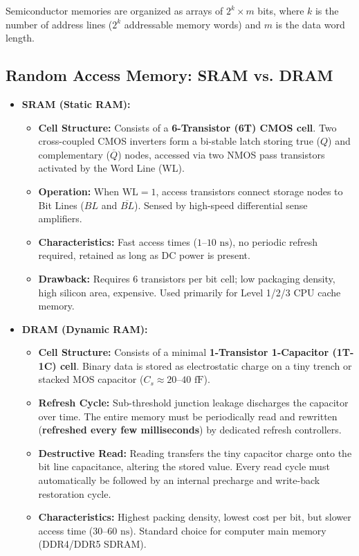 \documentclass[12pt,a4paper]{article}
\begin{document}
Semiconductor memories are organized as arrays of $2^k \times m$ bits, where $k$ is the number of address lines ($2^k$ addressable memory words) and $m$ is the data word length.

\subsection{Random Access Memory: SRAM vs. DRAM}
\begin{itemize}[leftmargin=*, itemsep=4pt]
  \item \textbf{SRAM (Static RAM):}
    \begin{itemize}
      \item \textbf{Cell Structure:} Consists of a \textbf{6-Transistor (6T) CMOS cell}. Two cross-coupled CMOS inverters form a bi-stable latch storing true ($Q$) and complementary ($\overline{Q}$) nodes, accessed via two NMOS pass transistors activated by the Word Line (WL).
      \item \textbf{Operation:} When $\text{WL} = 1$, access transistors connect storage nodes to Bit Lines ($BL$ and $\overline{BL}$). Sensed by high-speed differential sense amplifiers.
      \item \textbf{Characteristics:} Fast access times ($1\text{--}10\text{ ns}$), no periodic refresh required, retained as long as DC power is present.
      \item \textbf{Drawback:} Requires 6 transistors per bit cell; low packaging density, high silicon area, expensive. Used primarily for Level 1/2/3 CPU cache memory.
    \end{itemize}
  \item \textbf{DRAM (Dynamic RAM):}
    \begin{itemize}
      \item \textbf{Cell Structure:} Consists of a minimal \textbf{1-Transistor 1-Capacitor (1T-1C) cell}. Binary data is stored as electrostatic charge on a tiny trench or stacked MOS capacitor ($C_s \approx 20\text{--}40\text{ fF}$).
      \item \textbf{Refresh Cycle:} Sub-threshold junction leakage discharges the capacitor over time. The entire memory must be periodically read and rewritten (\textbf{refreshed every few milliseconds}) by dedicated refresh controllers.
      \item \textbf{Destructive Read:} Reading transfers the tiny capacitor charge onto the bit line capacitance, altering the stored value. Every read cycle must automatically be followed by an internal precharge and write-back restoration cycle.
      \item \textbf{Characteristics:} Highest packing density, lowest cost per bit, but slower access time ($30\text{--}60\text{ ns}$). Standard choice for computer main memory (DDR4/DDR5 SDRAM).
    \end{itemize}
\end{itemize}
\end{document}
